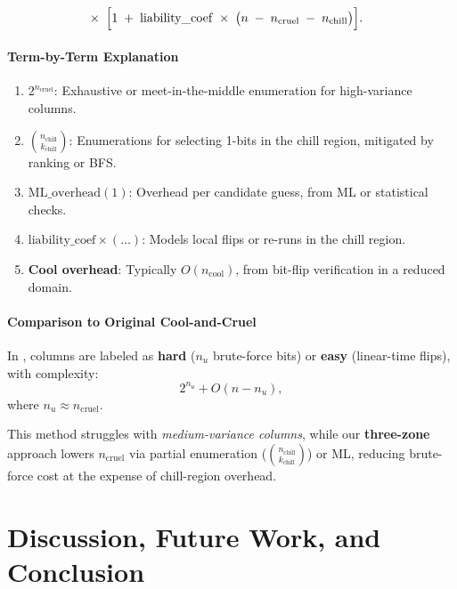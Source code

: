 \documentclass[conference]{IEEEtran}
\begin{document}
\vspace{-5mm}

\noindent
\begin{align*}
    &\times\;
    \Bigl[
    1 \;+\; \mathrm{liability\_coef}
        \;\times\;
        \bigl(
          n \;-\; n_{\mathrm{cruel}} \;-\; n_{\mathrm{chill}}
        \bigr)
  \Bigr].
\end{align*}

\paragraph{Term-by-Term Explanation}
\begin{enumerate}
  \item \( 2^{n_{\mathrm{cruel}}} \):  
    Exhaustive or meet-in-the-middle enumeration for high-variance columns.

  \item \( \binom{n_{\mathrm{chill}}}{k_{\mathrm{chill}}} \):  
    Enumerations for selecting 1-bits in the chill region, mitigated by ranking or BFS.

  \item \( \mathrm{ML\_overhead}(1) \):  
    Overhead per candidate guess, from ML or statistical checks.

  \item \( \mathrm{liability\_coef} \times (\dots) \):  
    Models local flips or re-runs in the chill region.

  \item \textbf{Cool overhead}:  
    Typically \( O(n_{\mathrm{cool}}) \), from bit-flip verification in a reduced domain.
\end{enumerate}

\paragraph{Comparison to Original Cool-and-Cruel}
In \cite{cool-and-cruel}, columns are labeled as \textbf{hard} (\( n_u \) brute-force bits) or \textbf{easy} (linear-time flips), with complexity:
\[
  2^{n_{u}} + O(n - n_u),
\]
where \( n_u \approx n_{\mathrm{cruel}} \).

This method struggles with \textit{medium-variance columns}, while our \textbf{three-zone} approach lowers \( n_{\mathrm{cruel}} \) via partial enumeration (\( \binom{n_{\mathrm{chill}}}{k_{\mathrm{chill}}} \)) or ML, reducing brute-force cost at the expense of chill-region overhead.

\section{Discussion, Future Work, and Conclusion}
\label{sec:discussion-future-conclusion}
\end{document}
